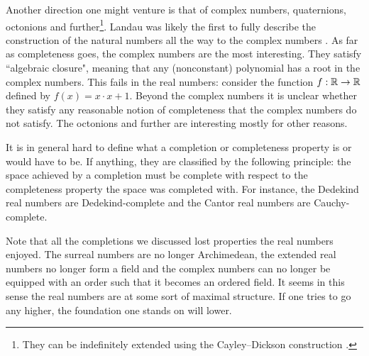 \documentclass[../main.tex]{subfiles}
\begin{document}
Another direction one might venture is that of complex numbers, quaternions, octonions and further\footnote{They can be indefinitely extended using the Cayley–Dickson construction \cite{Dickson1919}.}. Landau was likely the first to fully describe the construction of the natural numbers all the way to the complex numbers \cite{Landau1930}. As far as completeness goes, the complex numbers are the most interesting. They satisfy ``algebraic closure", meaning that any (nonconstant) polynomial has a root in the complex numbers. This fails in the real numbers: consider the function $f:\mathbb{R}\to\mathbb{R}$ defined by $f(x)=x\cdot x+1$. Beyond the complex numbers it is unclear whether they satisfy any reasonable notion of completeness that the complex numbers do not satisfy. The octonions and further are interesting mostly for other reasons.

It is in general hard to define what a completion or completeness property is or would have to be. If anything, they are classified by the following principle: the space achieved by a completion must be complete with respect to the completeness property the space was completed with. For instance, the Dedekind real numbers are Dedekind-complete and the Cantor real numbers are Cauchy-complete.

Note that all the completions we discussed lost properties the real numbers enjoyed. The surreal numbers are no longer Archimedean, the extended real numbers no longer form a field and the complex numbers can no longer be equipped with an order such that it becomes an ordered field. It seems in this sense the real numbers are at some sort of maximal structure. If one tries to go any higher, the foundation one stands on will lower.
\end{document}
